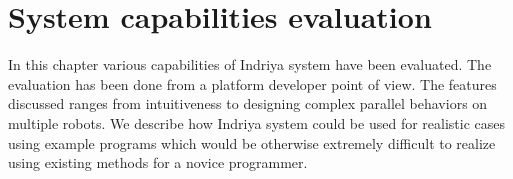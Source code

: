 
\chapter{System capabilities evaluation} %

\label{Chapter5} %


In this chapter various capabilities of Indriya system have been evaluated. The evaluation has been done from a platform developer point of view. The features discussed ranges from intuitiveness to designing complex parallel behaviors on multiple robots. We describe how Indriya system could be used for realistic cases using example programs which would be otherwise extremely difficult to realize using existing methods for a novice programmer.
